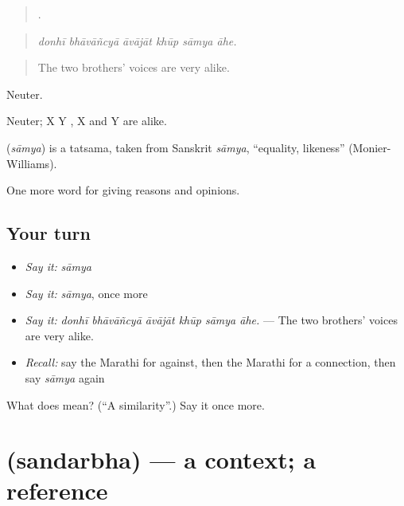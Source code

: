 \begin{quote}
     .
\end{quote}

\begin{quote}
\emph{donhī bhāvāñcyā āvājāt khūp sāmya āhe.}
\end{quote}

\begin{quote}
The two brothers' voices are very alike.
\end{quote}

Neuter.

Neuter; X  Y   , X and Y are alike.

\begin{cousinweb}
\textbf{} (\emph{sāmya}) is a tatsama, taken from Sanskrit \emph{sāmya}, \textquotedblleft{}equality, likeness\textquotedblright{} (Monier-Williams).
\end{cousinweb}

\begin{grammarlens}[title={What you've built}]
One more word for giving reasons and opinions.
\end{grammarlens}

\subsection*{Your turn}
\begin{itemize}
\raggedright
  \item \emph{Say it:} \emph{sāmya}
  \item \emph{Say it:} \emph{sāmya}, once more
  \item \emph{Say it:} \emph{donhī bhāvāñcyā āvājāt khūp sāmya āhe.} — The two brothers' voices are very alike.
  \item \emph{Recall:} say the Marathi for against, then the Marathi for a connection, then say \emph{sāmya} again
\end{itemize}

\begin{tcolorbox}[breakable,colback=teal!4,colframe=teal!35!black,title={Before you move on}]
What does  mean? (\textquotedblleft{}A similarity\textquotedblright{}.) Say it once more.
\end{tcolorbox}
\section[\texorpdfstring{\mr{संदर्भ} (sandarbha)}{संदर्भ (sandarbha)}]{ (sandarbha) — a context; a reference}

